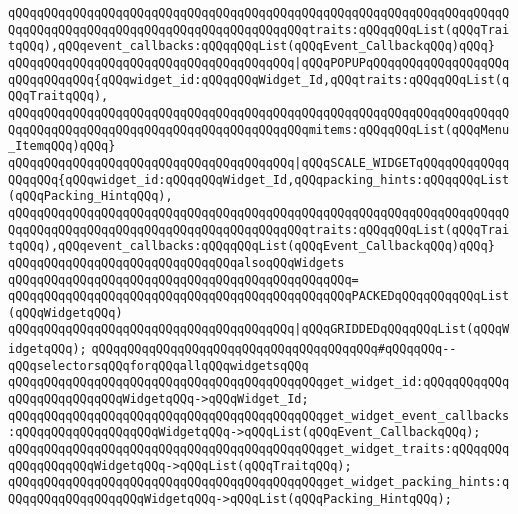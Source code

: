 \verb|qQQqqQQqqQQqqQQqqQQqqQQqqQQqqQQqqQQqqQQqqQQqqQQqqQQqqQQqqQQqqQQqqQQqqQQqqQQqqQQqqQQqqQQqqQQqqQQqqQQqqQQqqQQqqQQqtraits:qQQqqQQqList(qQQqTraitqQQq),qQQqevent_callbacks:qQQqqQQqList(qQQqEvent_CallbackqQQq)qQQq}|\newline
\verb|qQQqqQQqqQQqqQQqqQQqqQQqqQQqqQQqqQQqqQQq|\verb#|qQQqPOPUPqQQqqQQqqQQqqQQqqQQqqQQqqQQqqQQq{qQQqwidget_id:qQQqqQQqWidget_Id,qQQqtraits:qQQqqQQqList(qQQqTraitqQQq),#\newline
\verb|qQQqqQQqqQQqqQQqqQQqqQQqqQQqqQQqqQQqqQQqqQQqqQQqqQQqqQQqqQQqqQQqqQQqqQQqqQQqqQQqqQQqqQQqqQQqqQQqqQQqqQQqqQQqqQQqmitems:qQQqqQQqList(qQQqMenu_ItemqQQq)qQQq}|\newline
\verb|qQQqqQQqqQQqqQQqqQQqqQQqqQQqqQQqqQQqqQQq|\verb#|qQQqSCALE_WIDGETqQQqqQQqqQQqqQQqqQQq{qQQqwidget_id:qQQqqQQqWidget_Id,qQQqpacking_hints:qQQqqQQqList(qQQqPacking_HintqQQq),#\newline
\verb|qQQqqQQqqQQqqQQqqQQqqQQqqQQqqQQqqQQqqQQqqQQqqQQqqQQqqQQqqQQqqQQqqQQqqQQqqQQqqQQqqQQqqQQqqQQqqQQqqQQqqQQqqQQqqQQqtraits:qQQqqQQqList(qQQqTraitqQQq),qQQqevent_callbacks:qQQqqQQqList(qQQqEvent_CallbackqQQq)qQQq}|\newline
\newline
\verb|qQQqqQQqqQQqqQQqqQQqqQQqqQQqqQQqalsoqQQqWidgets|\newline
\verb|qQQqqQQqqQQqqQQqqQQqqQQqqQQqqQQqqQQqqQQqqQQqqQQq=|\newline
\verb|qQQqqQQqqQQqqQQqqQQqqQQqqQQqqQQqqQQqqQQqqQQqqQQqPACKEDqQQqqQQqqQQqList(qQQqWidgetqQQq)|\newline
\verb|qQQqqQQqqQQqqQQqqQQqqQQqqQQqqQQqqQQqqQQq|\verb#|qQQqGRIDDEDqQQqqQQqList(qQQqWidgetqQQq);#\newline
\newline
\newline
\verb|qQQqqQQqqQQqqQQqqQQqqQQqqQQqqQQqqQQqqQQq#qQQqqQQq--qQQqselectorsqQQqforqQQqallqQQqwidgetsqQQq|\newline
\verb|qQQqqQQqqQQqqQQqqQQqqQQqqQQqqQQqqQQqqQQqqQQqget_widget_id:qQQqqQQqqQQqqQQqqQQqqQQqqQQqWidgetqQQq->qQQqWidget_Id;|\newline
\verb|qQQqqQQqqQQqqQQqqQQqqQQqqQQqqQQqqQQqqQQqqQQqget_widget_event_callbacks:qQQqqQQqqQQqqQQqqQQqWidgetqQQq->qQQqList(qQQqEvent_CallbackqQQq);|\newline
\verb|qQQqqQQqqQQqqQQqqQQqqQQqqQQqqQQqqQQqqQQqqQQqget_widget_traits:qQQqqQQqqQQqqQQqqQQqWidgetqQQq->qQQqList(qQQqTraitqQQq);|\newline
\verb|qQQqqQQqqQQqqQQqqQQqqQQqqQQqqQQqqQQqqQQqqQQqget_widget_packing_hints:qQQqqQQqqQQqqQQqqQQqWidgetqQQq->qQQqList(qQQqPacking_HintqQQq);|\newline
